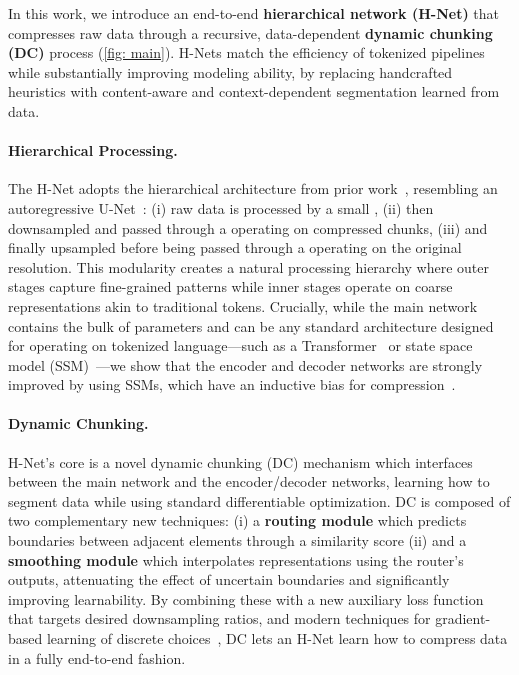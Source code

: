 In this work, we introduce an end-to-end \textbf{hierarchical network (H-Net)} that compresses raw data through a recursive, data-dependent \textbf{dynamic chunking (DC)} process (\cref{fig: main}).
H-Nets match the efficiency of tokenized pipelines while substantially improving modeling ability,
by replacing handcrafted heuristics with content-aware and context-dependent segmentation learned from data.

\paragraph{Hierarchical Processing.}
The H-Net adopts the hierarchical architecture from prior work~\citep{SaShiMi,HourglassTransformer,SpaceByte}, resembling an autoregressive U-Net~\citep{U-Net}: (i) raw data is processed by a small \textbf{\encoder{}}, (ii) then downsampled and passed through a \textbf{\main{}} operating on compressed chunks, (iii) and finally upsampled before being passed through a \textbf{\decoder{}} operating on the original resolution.
This modularity creates a natural processing hierarchy where outer stages capture fine-grained patterns while inner stages operate on coarse representations akin to traditional tokens.
Crucially, while the main network contains the bulk of parameters and can be any standard architecture designed for operating on tokenized language---such as a Transformer~\citep{Transformer} or state space model (SSM)~\citep{Mamba}---we show that the encoder and decoder networks are strongly improved by using SSMs, which have an inductive bias for compression~\citep{gu2025tradeoffs}.



\paragraph{Dynamic Chunking.}
H-Net's core is a novel dynamic chunking (DC) mechanism which interfaces between the main network and the encoder/decoder networks, learning how to segment data while using standard differentiable optimization.
DC is composed of two complementary new techniques: (i) a \textbf{routing module} which predicts boundaries between adjacent elements through a similarity score (ii) and a \textbf{smoothing module} which interpolates representations using the router's outputs, attenuating the effect of uncertain boundaries and significantly improving learnability.
By combining these with a new auxiliary loss function that targets desired downsampling ratios, and modern techniques for gradient-based learning of discrete choices~\citep{MoE,STE},
DC lets an H-Net learn how to compress data in a fully end-to-end fashion.

